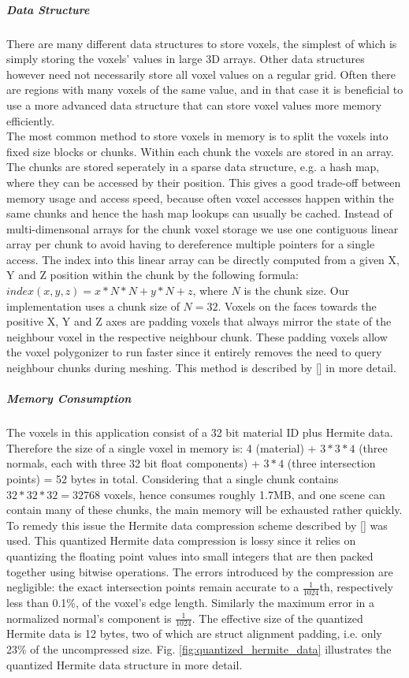 \subparagraph{Data Structure}

There are many different data structures to store voxels, the simplest of which is simply storing the voxels' values in large 3D arrays.
Other data structures however need not necessarily store all voxel values on a regular grid. Often there are regions with many voxels of the same value, and
in that case it is beneficial to use a more advanced data structure that can store voxel values more memory efficiently.\\
The most common method to store voxels in memory is to split the voxels into fixed size blocks or chunks. Within each chunk the voxels are stored in an array. The chunks are stored seperately in a sparse data structure, e.g. a hash map,
where they can be accessed by their position. This gives a good trade-off between memory usage and access speed, because often voxel accesses happen within the same chunks and hence the hash map lookups can usually be cached. Instead of multi-dimensonal arrays for the chunk voxel storage we use one contiguous linear array per chunk to avoid having to dereference multiple pointers for a single access. The index into this linear array can be directly computed from a given X, Y and Z position within the chunk by the following formula: $index(x, y, z) = x * N * N + y * N + z$, where $N$ is the chunk size.
Our implementation uses a chunk size of $N=32$. Voxels on the faces towards the positive X, Y and Z axes are padding voxels that always mirror the state of the neighbour voxel in the respective neighbour chunk.
These padding voxels allow the voxel polygonizer to run faster since it entirely removes the need to query neighbour chunks during meshing. This method is described by [] in more detail.

\subparagraph{Memory Consumption}

The voxels in this application consist of a 32 bit material ID plus Hermite data. Therefore the size of a single voxel in memory is: 4 (material) + $3*3*4$ (three normals, each with three 32 bit float components) + $3*4$ (three intersection points) = 52 bytes in total. Considering that a single chunk contains $32 * 32 * 32 = 32768$ voxels, hence consumes roughly 1.7MB, and one scene can contain many of these chunks,
the main memory will be exhausted rather quickly.
To remedy this issue the Hermite data compression scheme described by [] was used.
This quantized Hermite data compression is lossy since it relies on quantizing the floating point values into small integers that are then packed together using bitwise operations. The errors introduced by the compression are
negligible: the exact intersection points remain accurate to a $\frac{1}{1024}$th, respectively less than 0.1\%, of the voxel's edge length. Similarly the maximum error in a normalized normal's component is $\frac{1}{1024}$.
The effective size of the quantized Hermite data is 12 bytes, two of which are struct alignment padding, i.e. only 23\% of the uncompressed size. Fig. \ref{fig:quantized_hermite_data} illustrates the quantized Hermite data
structure in more detail.


